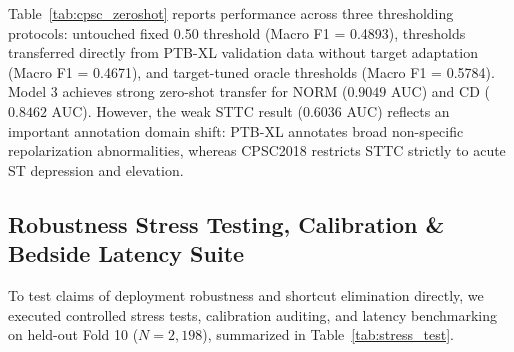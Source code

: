 \documentclass[12pt]{elsarticle}
\begin{document}
\begin{table}[htbp]
\caption{Audited Zero-Shot Generalization on CPSC2018 ($N=6,877$) across Three Decision Threshold Regimes.}
\label{tab:cpsc_zeroshot}
\centering
\small
{}
\end{table}

Table~\ref{tab:cpsc_zeroshot} reports performance across three thresholding protocols: untouched fixed 0.50 threshold (Macro F1 = 0.4893), thresholds transferred directly from PTB-XL validation data without target adaptation (Macro F1 = 0.4671), and target-tuned oracle thresholds (Macro F1 = 0.5784). Model 3 achieves strong zero-shot transfer for NORM ($0.9049$ AUC) and CD ($0.8462$ AUC). However, the weak STTC result ($0.6036$ AUC) reflects an important annotation domain shift: PTB-XL annotates broad non-specific repolarization abnormalities, whereas CPSC2018 restricts STTC strictly to acute ST depression and elevation.

\subsection{Robustness Stress Testing, Calibration \& Bedside Latency Suite}
\label{sec:robustness_calibration_latency}
To test claims of deployment robustness and shortcut elimination directly, we executed controlled stress tests, calibration auditing, and latency benchmarking on held-out Fold 10 ($N = 2,198$), summarized in Table~\ref{tab:stress_test}.
\end{document}
